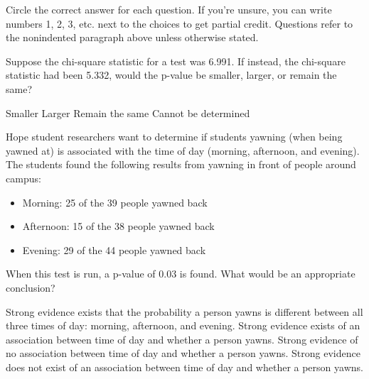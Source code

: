 \documentclass{article}
\begin{document}
	Circle the correct answer for each question.  If you're unsure, you can write numbers 1, 2, 3, etc. next to the choices to get partial credit.  Questions refer to the nonindented paragraph above unless otherwise stated.\\[.5cm]
	
	\begin{mcquestions}
		\question Suppose the chi-square statistic for a test was 6.991. If instead, the chi-square statistic had been 5.332, would the p-value be smaller, larger, or remain the same?
		\begin{mcanswerslist}
			\answer Smaller
			\answer[correct] Larger
			\answer Remain the same
			\answer Cannot be determined
		\end{mcanswerslist}
		
	\begin{mcquestioninstruction}
			Hope student researchers want to determine if students yawning (when being yawned at) is associated with the time of day (morning, afternoon, and evening). The students found the following results from yawning in front of people around campus:
		\begin{itemize}
			\item Morning: 25 of the 39 people yawned back
			\item Afternoon: 15 of the 38 people yawned back
			\item Evening: 29 of the 44 people yawned back
		\end{itemize}
	\end{mcquestioninstruction}
		\question When this test is run, a p-value of 0.03 is found. What would be an appropriate conclusion?
		\begin{mcanswerslist}
			\answer Strong evidence exists that the probability a person yawns is different between all three times of day: morning, afternoon, and evening.
			\answer[correct] Strong evidence exists of an association between time of day and whether a person yawns.
			\answer Strong evidence of no association between time of day and whether a person yawns.
			\answer Strong evidence does not exist of an association between time of day and whether a person yawns.
		\end{mcanswerslist}
		

\end{mcquestions}
\end{document}
